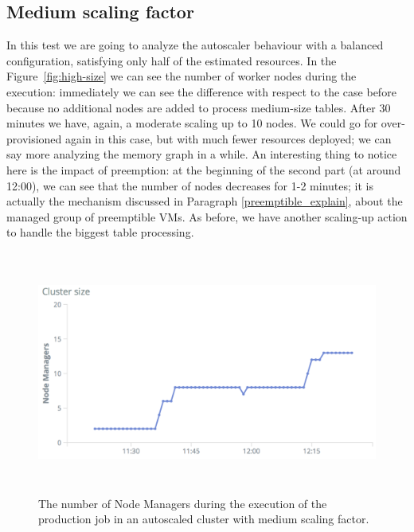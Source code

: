 \documentclass[12pt,twoside,cucitura]{toptesi}
\begin{document}
\subsection{Medium scaling factor}
In this test we are going to analyze the autoscaler behaviour with a balanced configuration, satisfying only half of the estimated resources. In the Figure~\ref{fig:high-size} we can see the number of worker nodes during the execution: immediately we can see the difference with respect to the case before because no additional nodes are added to process medium-size tables. After 30 minutes we have, again, a moderate scaling up to 10 nodes. We could go for over-provisioned again in this case, but with much fewer resources deployed; we can say more analyzing the memory graph in a while. An interesting thing to notice here is the impact of preemption: at the beginning of the second part (at around 12:00), we can see that the number of nodes decreases for 1-2 minutes; it is actually the mechanism discussed in Paragraph \ref{preemptible_explain}, about the managed group of preemptible VMs. As before, we have another scaling-up action to handle the biggest table processing.

\begin{figure}
\centering
\includegraphics[height=80mm]{medium-size}
\caption{The number of Node Managers during the execution of the production job in an autoscaled cluster with medium scaling factor.}\label{fig:medium-size}
\end{figure}
\end{document}
